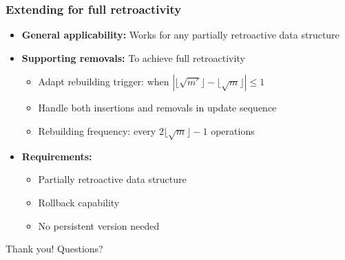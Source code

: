 \documentclass[fleqn]{beamer}
\def\\{}%
\begin{document}
\begin{frame}
    \frametitle{Extending for full retroactivity}
    
    \begin{itemize}
    \item \textbf{General applicability:} Works for any partially retroactive data structure \vfill\pause
    \item \textbf{Supporting removals:} To achieve full retroactivity \vfill
        \begin{itemize}
        \item Adapt rebuilding trigger: when $|\lfloor\sqrt{m'}\rfloor - \lfloor\sqrt{m}\rfloor| \leq 1$
        \item Handle both insertions and removals in update sequence
        \item Rebuilding frequency: every $2\lfloor\sqrt{m}\rfloor-1$ operations
        \end{itemize} \vfill\pause
    \item \textbf{Requirements:}
        \begin{itemize}
        \item Partially retroactive data structure
        \item Rollback capability
        \item No persistent version needed
        \end{itemize} \vfill
    \end{itemize}
\end{frame}

\begin{frame}
    \begin{center}
        \Huge{Thank you! \\ \vfill Questions?}
    \end{center}
\end{frame}
\end{document}
